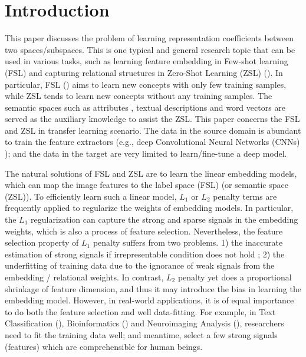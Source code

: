\documentclass{article}
\begin{document}
\section{Introduction}


This paper discusses the problem of learning representation coefficients
between two spaces/subspaces. This is one typical and general research
topic that can be used in various tasks, such as learning feature
embedding in Few-shot learning (FSL) and capturing relational
structures in Zero-Shot Learning (ZSL) (\citet{palatucci2009zero}).
In particular, FSL (\citet{fei2006one}) aims to learn new concepts
with only few training samples, while ZSL tends to learn new concepts
without any training samples. The semantic spaces such as attributes
\citet{lampert13AwAPAMI}, textual descriptions \citet{deep_0shot}
and word vectors \citet{fu2016semi} are served as the auxiliary knowledge
to assist the ZSL. This paper concerns the FSL and ZSL in transfer
learning scenario. The data in the source domain is abundant to train
the feature extractors (e.g., deep Convolutional Neural Networks (CNNs)
\citet{krizhevsky2012imagenet,simonyan2014very,InceptionNet,he2016deep});
and the data in the target are very limited to learn/fine-tune a deep
model.


The natural solutions of FSL and ZSL are to learn the linear embedding
models, which can map the image features to the label space (FSL)
(or semantic space (ZSL)). To efficiently learn such a linear model, $L_{1}$
or $L_{2}$ penalty terms are frequently applied to regularize the
weights of embedding models. In particular, the $L_{1}$ regularization
can capture the strong and sparse signals in the embedding weights,
which is also a process of feature selection. Nevertheless, the feature
selection property of $L_{1}$ penalty suffers from two problems.
1) the inaccurate estimation of strong signals if irrepresentable
condition does not hold \citet{modelselection_jmlr}; 2) the underfitting
of training data due to the ignorance of weak signals from the embedding
/ relational weights. In contrast, $L_{2}$ penalty yet does a proportional
shrinkage of feature dimension, and thus it may introduce the bias
in learning the embedding model. However, in real-world applications,
it is of equal importance to do both the feature selection and well
data-fitting. For example, in Text Classification (\citet{forman2003extensive}),
Bioinformatics (\citet{saeys2007review}) and Neuroimaging Analysis
(\citet{sun2017gsplit}), researchers need to fit the training data
well; and meantime, select a few strong signals (features) which are
comprehensible for human beings.
\end{document}
